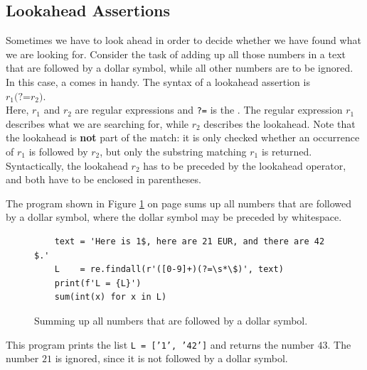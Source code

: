 \subsection{Lookahead Assertions}
Sometimes we have to look ahead in order to decide whether we have found what we are looking for.  Consider the
task of adding up all those numbers in a text that are followed by a dollar symbol, while all other numbers are
to be ignored.  In this case, a  comes in handy.  The syntax of a lookahead assertion
is
\\[0.2cm]
\hspace*{1.3cm}
$r_1\texttt{(?=}r_2\texttt{)}$.
\\[0.2cm]
Here, $r_1$ and $r_2$ are regular expressions and \texttt{?=} is the .  The regular
expression $r_1$ describes what we are searching for, while $r_2$ describes the lookahead.  Note that the
lookahead is \textbf{not} part of the match: it is only checked whether an occurrence of $r_1$ is followed by
$r_2$, but only the substring matching $r_1$ is returned.  Syntactically, the lookahead $r_2$ has to be preceded
by the lookahead operator, and both have to be enclosed in parentheses.

The program shown in Figure \ref{fig:lookahead.py} on page \pageref{fig:lookahead.py} sums up all numbers that
are followed by a dollar symbol, where the dollar symbol may be preceded by whitespace.

\begin{figure}[!ht]
\centering
  \begin{verbatim}
    text = 'Here is 1$, here are 21 EUR, and there are 42 $.'
    L    = re.findall(r'([0-9]+)(?=\s*\$)', text)
    print(f'L = {L}')
    sum(int(x) for x in L)
\end{verbatim}
\vspace*{-0.3cm}
\caption{Summing up all numbers that are followed by a dollar symbol.}
\label{fig:lookahead.py}
\end{figure}

\noindent
This program prints the list \texttt{L = ['1', '42']} and returns the number $43$.  The number $21$ is ignored,
since it is not followed by a dollar symbol.

